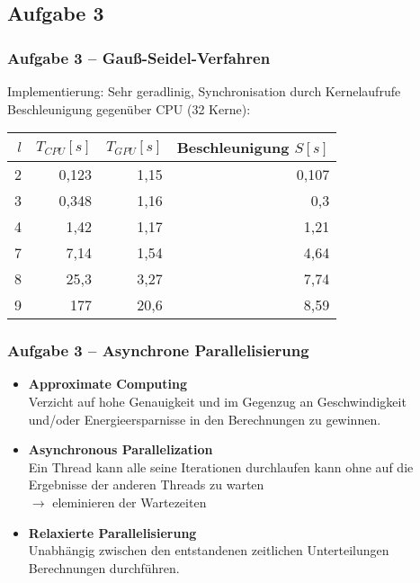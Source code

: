 \documentclass[german,notes,18pt]{beamer}
\begin{document}
	\subsection{Aufgabe 3}
	\begin{frame}
		\frametitle{Aufgabe 3 -- Gauß-Seidel-Verfahren}
		Implementierung: Sehr geradlinig, Synchronisation durch Kernelaufrufe \\
		\vspace{2em}
		Beschleunigung gegenüber CPU (32 Kerne):
		\begin{center}
			\begin{tabular}{r|r|r|r}
			$l$ & $T_{CPU}[s]$ & $T_{GPU}[s]$ & Beschleunigung $S[s]$ \\
			\hline
			2 & 0,123 & 1,15 & \color{lightred}0,107 \\
			3 & 0,348 & 1,16 & \color{lightred}0,3  \\
			4 & 1,42 & 1,17 & 1,21 \\
			\hline
			7 & 7,14 & 1,54 & 4,64 \\
			8 & 25,3 & 3,27 & 7,74 \\
			9 & 177 & 20,6 & 8,59 \\
		\end{tabular}
		\end{center}
	\end{frame}
	\begin{frame}
		\frametitle{Aufgabe 3 -- Asynchrone Parallelisierung}
		\begin{itemize}
			\item \textbf{Approximate Computing} \\
			Verzicht auf hohe Genauigkeit und im Gegenzug an Geschwindigkeit und/oder Energieersparnisse in den Berechnungen zu gewinnen. 
				\vspace{2em}
			
			\item \textbf{Asynchronous Parallelization} \\
			Ein Thread kann alle seine Iterationen durchlaufen kann ohne auf die Ergebnisse der anderen Threads zu warten \\
			$\rightarrow$ eleminieren der Wartezeiten
				\vspace{2em}
			
			\item \textbf{Relaxierte Parallelisierung} \\
			Unabhängig zwischen den entstandenen zeitlichen Unterteilungen Berechnungen durchführen.
		\end{itemize}
	\end{frame}
\end{document}
